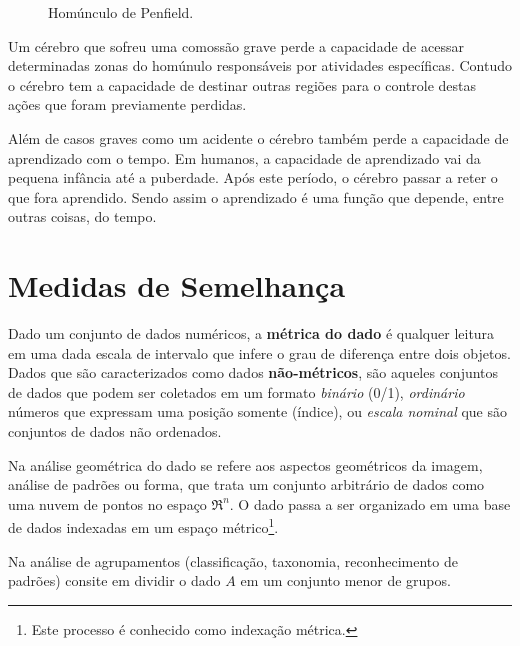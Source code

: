 \begin{figure}[H]
	\centering
	\setlength{\fboxsep}{8pt}
	\setlength{\fboxrule}{0.1pt}
	\caption{Homúnculo de Penfield.}
	\label{homunculo}
\end{figure}

Um cérebro que sofreu uma comossão grave perde a capacidade de acessar
determinadas zonas do homúnulo responsáveis por atividades específicas. Contudo
o cérebro tem a capacidade de destinar outras regiões para o controle destas
ações que foram previamente perdidas.

Além de casos graves como um acidente o cérebro também perde a capacidade de
aprendizado com o tempo. Em humanos, a capacidade de aprendizado vai da pequena
infância até a puberdade. Após este período, o cérebro passar a reter o que fora
aprendido. Sendo assim o aprendizado é uma função que depende, entre outras
coisas, do tempo.

\section{Medidas de Semelhança}

Dado um conjunto de dados numéricos, a \textbf{métrica do dado} é qualquer leitura em uma dada escala de intervalo que infere o grau de diferença entre dois objetos.  Dados que são caracterizados como dados \textbf{não-métricos}, são aqueles conjuntos de dados que podem ser coletados em um formato \textit{binário} (0/1),  \textit{ordinário} números que expressam uma posição somente (índice), ou \textit{escala nominal} que são conjuntos de dados não ordenados.

Na análise geométrica do dado se refere aos aspectos geométricos da imagem, análise de padrões ou forma, que trata um conjunto arbitrário de dados como uma nuvem de pontos no espaço  $\Re ^{n}$. O dado passa a ser organizado em uma base de dados indexadas em um espaço métrico\footnote{Este processo é conhecido como indexação métrica.}.

Na análise de agrupamentos (classificação, taxonomia, reconhecimento de padrões) consite em dividir o dado $A$ em um conjunto menor de grupos. 